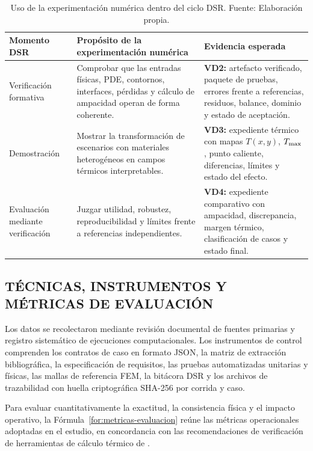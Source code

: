 \begin{table}[htbp]
\centering
\caption{Uso de la experimentación numérica dentro del ciclo DSR. Fuente: Elaboración propia.}
\label{tab:experimentacion-dsr}
\begin{tabularx}{\textwidth}{L{3.2cm}Y Y}
\toprule
\textbf{Momento DSR} & \textbf{Propósito de la experimentación numérica} & \textbf{Evidencia esperada} \\
\midrule
Verificación formativa & Comprobar que las entradas físicas, PDE, contornos, interfaces, pérdidas y cálculo de ampacidad operan de forma coherente. & \textbf{VD2:} artefacto verificado, paquete de pruebas, errores frente a referencias, residuos, balance, dominio y estado de aceptación. \\
Demostración & Mostrar la transformación de escenarios con materiales heterogéneos en campos térmicos interpretables. & \textbf{VD3:} expediente térmico con mapas $T(x,y)$, $T_{\max}$, punto caliente, diferencias, límites y estado del efecto. \\
Evaluación mediante verificación & Juzgar utilidad, robustez, reproducibilidad y límites frente a referencias independientes. & \textbf{VD4:} expediente comparativo con ampacidad, discrepancia, margen térmico, clasificación de casos y estado final. \\
\bottomrule
\end{tabularx}
\end{table}

\subsection{TÉCNICAS, INSTRUMENTOS Y MÉTRICAS DE EVALUACIÓN}
\label{subsec:relevancia-decision}

Los datos se recolectaron mediante revisión documental de fuentes primarias y registro sistemático de ejecuciones computacionales. Los instrumentos de control comprenden los contratos de caso en formato JSON, la matriz de extracción bibliográfica, la especificación de requisitos, las pruebas automatizadas unitarias y físicas, las mallas de referencia FEM, la bitácora DSR y los archivos de trazabilidad con huella criptográfica SHA-256 por corrida y caso.

Para evaluar cuantitativamente la exactitud, la consistencia física y el impacto operativo, la Fórmula~\ref{for:metricas-evaluacion} reúne las métricas operacionales adoptadas en el estudio, en concordancia con las recomendaciones de verificación de herramientas de cálculo térmico de \textcite[93--99]{cigre2025}.

